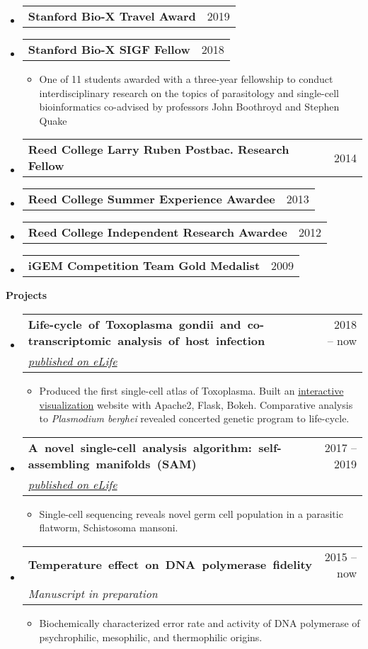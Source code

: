 \documentclass[letterpaper,12pt]{article}[leftmargin=*]
\makeatletter
\def \entryspacing {-0pt}
\renewcommand{\section}[2]{\vspace{5pt}
  \colorbox{secondary}{\color{white}\raggedbottom\normalsize\textbf{{#1}{\hspace{7pt}#2}}}
}
\newcommand{\resumeEntryStart}{\begin{itemize}[leftmargin=2.5mm]}
\newcommand{\resumeEntryEnd}{\end{itemize}\vspace{\entryspacing}}
\newcommand{\resumeItemListStart}{\begin{itemize}[leftmargin=4.5mm]}
\newcommand{\resumeItemListEnd}{\end{itemize}}
\newcommand{\resumeItem}[1]{
  \item\small{
    {#1 \vspace{-2pt}}
  }
}
\newcommand{\resumeEntryTSDL}[4]{
  \vspace{-1pt}\item[]
    \begin{tabularx}{0.97\textwidth}{X@{\hspace{40pt}}r}
      \mbox{\textbf{\color{primary}#1}} & {\firabook\color{accent}\small#2} \\
      \textit{\color{accent}\small#3} & \textit{\color{accent}\small#4} \\
    \end{tabularx}\vspace{-8pt}
}
\newcommand{\resumeEntryTD}[2]{
  \vspace{-1pt}\item[]
    \begin{tabularx}{0.97\textwidth}{X@{\hspace{40pt}}r}
      \textbf{\color{primary}#1} & {\firabook\color{accent}\small#2} \\
    \end{tabularx}\vspace{-6pt}
}
\makeatother
\begin{document}
  \resumeEntryStart
    \resumeEntryTD
      {Stanford Bio-X Travel Award}{2019}
    \resumeEntryTD
      {Stanford Bio-X SIGF Fellow}{2018}
    \resumeItemListStart
      \resumeItem {One of 11 students awarded with a three-year fellowship to conduct interdisciplinary research on the topics of parasitology and single-cell bioinformatics co-advised by professors John Boothroyd and Stephen Quake}
    \resumeItemListEnd
    \resumeEntryTD
      {Reed College Larry Ruben Postbac. Research Fellow}{2014}
    \resumeEntryTD
      {Reed College Summer Experience Awardee}{2013}
    \resumeEntryTD
      {Reed College Independent Research Awardee}{2012}
    \resumeEntryTD
      {iGEM Competition Team Gold Medalist}{2009}
  \resumeEntryEnd

\section{\faFlask}{Projects}

  \resumeEntryStart
    \resumeEntryTSDL
      {Life-cycle of Toxoplasma gondii and co-transcriptomic analysis of host infection}{2018 -- now}
      {\href{https://elifesciences.org/articles/54129}{published on eLife}}{}
    \resumeItemListStart
      \resumeItem {Produced the first single-cell atlas of Toxoplasma. Built an \href{http://st-atlas.org}{interactive visualization} website with Apache2, Flask, Bokeh. Comparative analysis to \textit{Plasmodium berghei} revealed concerted genetic program to life-cycle.}
    \resumeItemListEnd
  \resumeEntryEnd

  \resumeEntryStart
    \resumeEntryTSDL
      {A novel single-cell analysis algorithm: self-assembling manifolds (SAM)}{2017 -- 2019}
      {\href{https://elifesciences.org/articles/48994}{published on eLife}}{}
    \resumeItemListStart
      \resumeItem {Single-cell sequencing reveals novel germ cell population in a parasitic flatworm, Schistosoma mansoni.}
    \resumeItemListEnd
  \resumeEntryEnd

  \resumeEntryStart
    \resumeEntryTSDL
      {Temperature effect on DNA polymerase fidelity}{2015 -- now}
      {Manuscript in preparation}{}
    \resumeItemListStart
      \resumeItem {Biochemically characterized error rate and activity of DNA polymerase of psychrophilic, mesophilic, and thermophilic origins.}
    \resumeItemListEnd
  \resumeEntryEnd


\newpage
\end{document}
